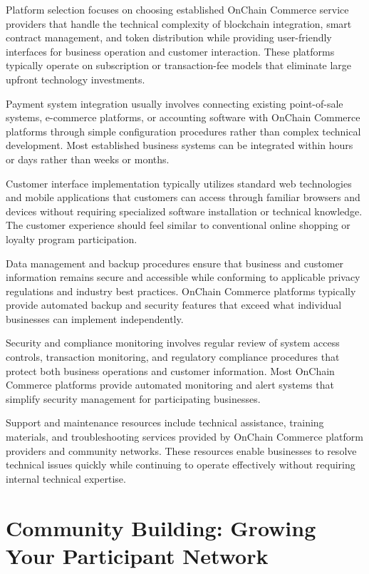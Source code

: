 \documentclass[
  Letterpaper,
]{scrbook}
\begin{document}
Platform selection focuses on choosing established OnChain Commerce
service providers that handle the technical complexity of blockchain
integration, smart contract management, and token distribution while
providing user-friendly interfaces for business operation and customer
interaction. These platforms typically operate on subscription or
transaction-fee models that eliminate large upfront technology
investments.

Payment system integration usually involves connecting existing
point-of-sale systems, e-commerce platforms, or accounting software with
OnChain Commerce platforms through simple configuration procedures
rather than complex technical development. Most established business
systems can be integrated within hours or days rather than weeks or
months.

Customer interface implementation typically utilizes standard web
technologies and mobile applications that customers can access through
familiar browsers and devices without requiring specialized software
installation or technical knowledge. The customer experience should feel
similar to conventional online shopping or loyalty program
participation.

Data management and backup procedures ensure that business and customer
information remains secure and accessible while conforming to applicable
privacy regulations and industry best practices. OnChain Commerce
platforms typically provide automated backup and security features that
exceed what individual businesses can implement independently.

Security and compliance monitoring involves regular review of system
access controls, transaction monitoring, and regulatory compliance
procedures that protect both business operations and customer
information. Most OnChain Commerce platforms provide automated
monitoring and alert systems that simplify security management for
participating businesses.

Support and maintenance resources include technical assistance, training
materials, and troubleshooting services provided by OnChain Commerce
platform providers and community networks. These resources enable
businesses to resolve technical issues quickly while continuing to
operate effectively without requiring internal technical expertise.

\section{Community Building: Growing Your Participant
Network}\label{community-building-growing-your-participant-network}
\end{document}
